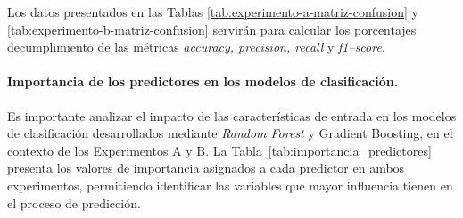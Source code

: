 \documentclass[a4paper,fleqn]{cas-sc}
\begin{document}
	Los datos presentados en las Tablas \ref{tab:experimento-a-matriz-confusion}	y \ref{tab:experimento-b-matriz-confusion}  servirán para calcular los porcentajes decumplimiento de las métricas \textit{accuracy, precision, recall} y  \textit{f1--score}.



\paragraph{\textbf{Importancia de los predictores en los modelos de clasificación.}}
	Es importante analizar el impacto de las caracter\'isticas de entrada en los modelos de clasificaci\'on desarrollados mediante \textit{Random Forest} y {Gradient Boosting}, en el contexto de los Experimentos A y B. La Tabla~\ref{tab:importancia_predictores} presenta los valores de importancia asignados a cada predictor en ambos experimentos, permitiendo identificar las variables que mayor influencia tienen en el proceso de predicci\'on.
\end{document}
